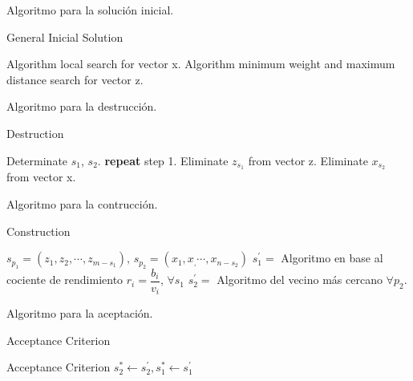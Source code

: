 \documentclass{article}
\theoremstyle{mytheoremstyle}
\theoremstyle{mytheoremstyle}
\theoremstyle{myproblemstyle}
\begin{document}
    Algoritmo para la solución inicial.
    \begin{algorithm}
    	\caption{General Inicial Solution}
    	\begin{algorithmic}[1]
    		\State Algorithm local search for vector x.
    		\State Algorithm minimum weight and maximum distance search for vector z. 
    	\end{algorithmic}
    \end{algorithm}
    
    Algoritmo para la destrucción.
    \begin{algorithm}
    	\caption{Destruction}
    	\begin{algorithmic}[1]
    		\State Determinate $s_1$, $s_2$. 
    		\State \textbf{repeat} step 1.
    		\EndIf
    		\State Eliminate $z_{s_1}$ from vector z.
    		\State Eliminate $x_{s_2}$ from vector x.
    		
    	\end{algorithmic}
    \end{algorithm}
    
    Algoritmo para la contrucción.
    \begin{algorithm}[h!]
    	\caption{Construction}
    	\begin{algorithmic}[1]
    		\State  $s_{p_1} = (z_1,z_2, \cdots ,z_{m-s_1}), \, s_{p_2} = (x_1,x_, \cdots ,x_{n-s_2})$
    		\State  $s^{'}_1=$ Algoritmo en base al cociente de rendimiento $r_i = \dfrac{b_i}{v_i}, \, \forall s_1$
    		\State  $s^{'}_2 =$ Algoritmo del vecino más cercano $\forall p_2 $.
    		
    	\end{algorithmic}
    \end{algorithm}    
    
    Algoritmo para la aceptación.
    \begin{algorithm}[h!]
    	\caption{Acceptance Criterion}
    	\begin{algorithmic}[1]
    		\State Acceptance Criterion 
    		\State $ s_{2}^{*}\longleftarrow s^{'}_{2} ,s_{1}^{*} \longleftarrow s^{'}_{1}$
    		\EndIf
    	\end{algorithmic}
    \end{algorithm}  
	
\end{document}
